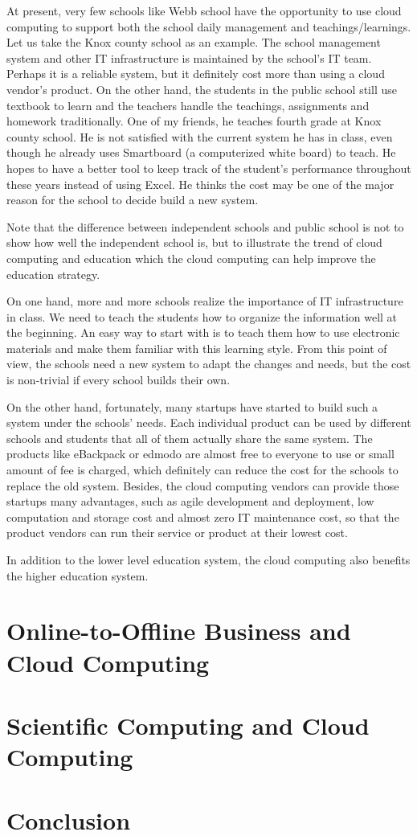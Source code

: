 At present, very few schools like Webb school have the opportunity to use cloud computing to support both the school daily management and teachings/learnings. Let us take the Knox county school as an example. The school management system  and other IT infrastructure is maintained by the school's IT team. Perhaps it is a reliable system, but it definitely cost more than using a cloud vendor's product. On the other hand, the students in the public school still use textbook to learn and the teachers handle the teachings, assignments and homework traditionally. One of my friends, he teaches fourth grade at Knox county school. He is not satisfied with the current system he has in class, even though he already uses Smartboard (a computerized white board) to teach. He hopes to have a better tool to keep track of the student's performance throughout these years instead of using Excel. He thinks the cost may be one of the major reason for the school to decide build a new system.

Note that the difference between independent schools and public school is not to show how well the independent school is, but to illustrate the trend of cloud computing and education which the cloud computing can help improve the education strategy.

On one hand, more and more schools realize the importance of IT infrastructure in class. We need to teach the students how to organize the information well at the beginning. An easy way to start with is to teach them how to use electronic materials and make them familiar with this learning style. From this point of view, the schools need a new system to adapt the changes and needs, but the cost is non-trivial if every school builds their own. 

On the other hand, fortunately, many startups have started to build such a system under the schools' needs. Each individual product can be used by different schools and students that all of them actually share the same system. The products like eBackpack or edmodo are almost free to everyone to use or small amount of fee is charged, which definitely can reduce the cost for the schools to replace the old system. Besides, the cloud computing vendors can provide those startups many advantages, such as agile development and deployment, low computation and storage cost and almost zero IT maintenance cost, so that the product vendors can run their service or product at their lowest cost.

In addition to the lower level education system, the cloud computing also benefits the higher education system.

\section{Online-to-Offline Business and Cloud Computing}

\section{Scientific Computing and Cloud Computing}

\section{Conclusion}
